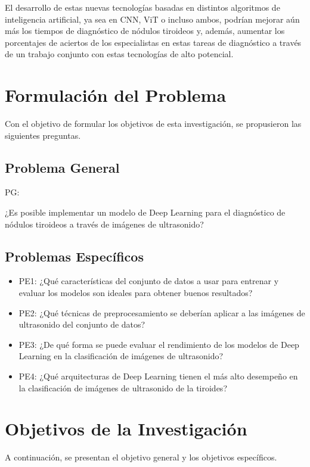El desarrollo de estas nuevas tecnologías basadas en distintos algoritmos de inteligencia artificial, ya sea en CNN, ViT o incluso ambos, podrían mejorar aún más los tiempos de diagnóstico de nódulos tiroideos y, además, aumentar los porcentajes de aciertos de los especialistas en estas tareas de diagnóstico a través de un trabajo conjunto con estas tecnologías de alto potencial.



\section{Formulación del Problema}
Con el objetivo de formular los objetivos de esta investigación, se propusieron las siguientes preguntas.
\subsection{Problema General}
PG: \newcommand{\ProblemaGeneral}{
¿Es posible implementar un modelo de Deep Learning para el diagnóstico de nódulos tiroideos a través de imágenes de ultrasonido?
}
\ProblemaGeneral
\subsection{Problemas Específicos}
\newcommand{\Pbone}{
¿Qué características del conjunto de datos a usar para entrenar y evaluar los modelos son ideales para obtener buenos resultados?
}
\newcommand{\Pbtwo}{
¿Qué técnicas de preprocesamiento se deberían aplicar a las imágenes de ultrasonido del conjunto de datos?
}
\newcommand{\Pbthree}{
¿De qué forma se puede evaluar el rendimiento de los modelos de Deep Learning en la clasificación de imágenes de ultrasonido?
}
\newcommand{\Pbfour}{
¿Qué arquitecturas de Deep Learning tienen el más alto desempeño en la clasificación de imágenes de ultrasonido de la tiroides?
}

\begin{itemize}
	\item PE1: {\Pbone}
	\item PE2: {\Pbtwo}
	\item PE3: {\Pbthree}
	\item PE4: {\Pbfour}
\end{itemize}

\section{Objetivos de la Investigación}
A continuación, se presentan el objetivo general y los objetivos específicos.

